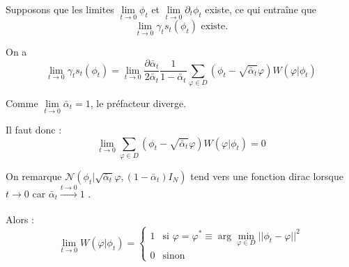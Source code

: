\documentclass[a4paper,10pt]{article}
\theoremstyle{definition} %
\theoremstyle{definition} %
\theoremstyle{definition} %
\theoremstyle{definition} %
\begin{document}



Supposons que les limites $\lim\limits_{t \to 0} \phi_t$ et $\lim\limits_{t \to 0} \partial_t \phi_t$ existe, ce qui entraîne que
\begin{equation*}
    \lim\limits_{t \to 0} \gamma_t s_t (\phi_t) \text{ existe}.
\end{equation*}


On a 
\begin{equation*}
    \lim\limits_{t \to 0} \gamma_t s_t (\phi_t) = \lim\limits_{t \to 0} \frac{\partial \bar{\alpha}_t}{2\bar{\alpha}_t} \frac{1}{1 - \bar{\alpha}_t} \sum\limits_{\varphi \in D} \left( \phi_t - \sqrt{\bar{\alpha}_t} \varphi \right) W(\varphi | \phi_t)
\end{equation*}


Comme  $\lim\limits_{t \to 0} \bar{\alpha}_t = 1$, le préfacteur diverge.

Il faut donc :
\begin{equation*}
    \lim\limits_{t \to 0} \sum\limits_{\varphi \in D} (\phi_t - \sqrt{\bar{\alpha}_t} \varphi) W(\varphi | \phi_t) = 0
\end{equation*}


On remarque $\mathcal{N}(\phi_t | \sqrt{\bar{\alpha}_t} \varphi, (1 - \bar{\alpha}_t) I_N)$ tend vers une fonction dirac lorsque $t \to 0$ car $\bar{\alpha}_t \xrightarrow[]{t \to 0} 1$ .

Alors :
\begin{equation*}
    \lim\limits_{t \to 0} W(\varphi | \phi_t) =
\begin{cases} 
1 & \text{si } \varphi = \varphi^* \equiv \arg\min_{\varphi \in D} ||\phi_t - \varphi||^2 \\
0 & \text{sinon}
\end{cases}
\end{equation*}
\end{document}
